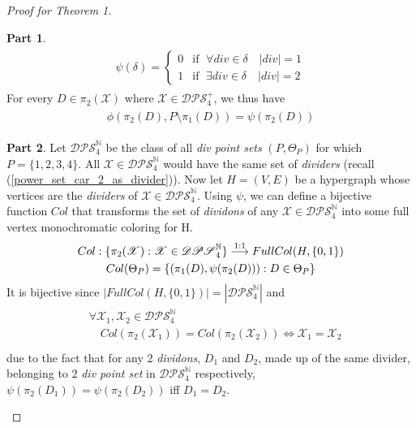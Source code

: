 \documentclass[11pt, oneside]{article}      %
\theoremstyle{definition}
\newtheorem{proofpart}{Part}[theo]
\numberwithin{equation}{section}
\newcommand{\reff}[1]{(\ref{#1})}
\theoremstyle{c}
\begin{document}
\begin{proof}[Proof for \textit{Theorem 1}]
\begin{proofpart}
\begin{gather}
\begin{split}
    \psi(\delta)=
\begin{cases}
    0 & \text{if } \;  \forall \textit{div} \in \delta \quad |div| = 1 \\
     1 & \text{if } \; \exists \textit{div} \in \delta \quad |div| = 2
\end{cases}
\end{split}\end{gather}
For every $D \in \pi_2(\mathscr{X})$ where $\mathscr{X} \in \mathscr{DPS}^+_4$, we thus have
\begin{gather}\label{phi_to_delta}\begin{split}
\phi(\pi_2(D), P \setminus \pi_1(D) ) = \psi(\pi_2(D))
\end{split}\end{gather}
\end{proofpart}
\begin{proofpart}
Let $\mathscr{DPS}^\mathbb{N}_4$ be the class of all \textit{div point sets} $(P,\Theta_P)$ for which $P = \{1,2,3,4\}$. All $\mathscr{X} \in \mathscr{DPS}^\mathbb{N}_4$ would have the same set of \textit{dividers} (recall \reff{power_set_car_2_as_divider}). Now let $H=(V,E)$ be a hypergraph whose vertices are the \textit{dividers} of $\mathscr{X} \in \mathscr{DPS}^\mathbb{N}_4$. Using $\psi$, we can define a bijective function $Col$ that transforms the set of \textit{dividons} of any $\mathscr{X} \in \mathscr{DPS}^\mathbb{N}_4$ into some full vertex monochromatic coloring for H.
\begin{equation}
\begin{gathered}\label{coloring1}
Col : \{\pi_2(\mathscr{X}) : \mathscr{X} \in \mathscr{DPS}^\mathbb{N}_4\} \stackrel{\rm{1:1}}{\longrightarrow} FullCol(H,\{0,1\}) \\
Col(\Theta_P) = \{ (\pi_1(D),\psi(\pi_2(D))) : D \in \Theta_P \} \\
\end{gathered}
\end{equation}
It is bijective since $|FullCol(H,\{0,1\})| = |\mathscr{DPS}^\mathbb{N}_4|$ and
\begin{gather}\begin{split}
&\forall \mathscr{X_1}, \mathscr{X_2} \in \mathscr{DPS}^{\mathbb{N}}_4 \\
&\quad Col(\mathscr{\pi_2(X_1)}) =  Col(\mathscr{\pi_2(X_2)}) \Leftrightarrow \mathscr{X_1} = \mathscr{X_2} \\
\end{split}\end{gather}
due to the fact that for any 2 \textit{dividons}, $D_1$ and $D_2$, made up of the same divider, belonging to 2 \textit{div point set} in $\mathscr{DPS}^{\mathbb{N}}_4$ respectively, $\psi(\pi_2(D_1))=\psi(\pi_2(D_2))$  iff $D_1 = D_2$.

\end{proofpart}
\end{proof}
\end{document}
